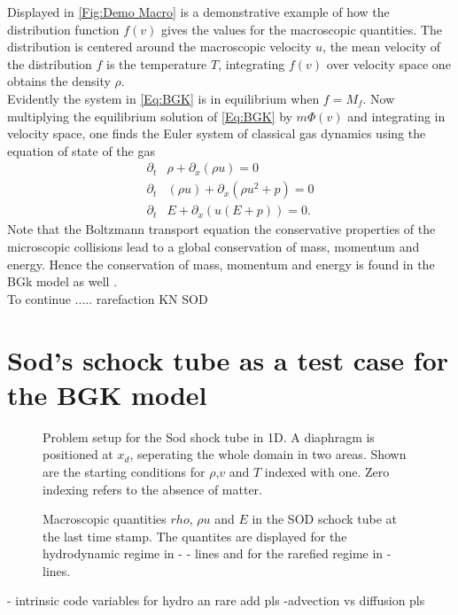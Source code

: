 Displayed in \cref{Fig:Demo Macro} is a demonstrative example of how the distribution function \(f(v)\) gives the values for the macroscopic quantities. The distribution is centered around the macroscopic velocity \(u\), the mean velocity of the distribution \(f\) is the temperature \(T\), integrating \(f(v)\) over velocity space one obtains the density \(\rho\).\\
Evidently the system in \cref{Eq:BGK} is in equilibrium when \(f = M_f\). Now multiplying the equilibrium solution of \cref{Eq:BGK} by \(m\Phi(v)\) and integrating in velocity space, one finds the Euler system of classical gas dynamics using the equation of state of the gas \cite{puppo2019kinetic}
\begin{align}
	\partial_t&\rho + \partial_x(\rho u) = 0
	\\
	\partial_t&(\rho u) + \partial_x(\rho u^2 + p) = 0
	\\
	\partial_t&E + \partial_x(u(E+p)) = 0 \textrm{.}
\end{align} 
Note that the Boltzmann transport equation the conservative properties of the microscopic collisions lead to a global conservation of mass, momentum and energy. Hence the conservation of mass, momentum and energy is found in the BGk model as well \cite{puppo2019kinetic}.\\
To continue .....
rarefaction KN
SOD
\section{Sod's schock tube as a test case for the BGK model} \label{FeaturesSOD}
\begin{figure}
	\centering
	
	\caption{Problem setup for the Sod shock tube in 1D. A diaphragm is positioned at \(x_d\), seperating the whole domain in two areas. Shown are the starting conditions for \(\rho\),\(v\) and \(T\) indexed with one. Zero indexing refers to the absence of matter.}
	\label{Fig:SodProbSetup}
\end{figure}
\begin{figure}[!htbp]
	
	\caption{Macroscopic quantities \(rho\), \(\rho u\) and \(E\) in the SOD schock tube at the last time stamp. The quantites are displayed for the hydrodynamic regime in - - lines and for the rarefied regime in - lines.}
\end{figure}
- intrinsic code variables for hydro an rare add pls
-advection vs diffusion pls